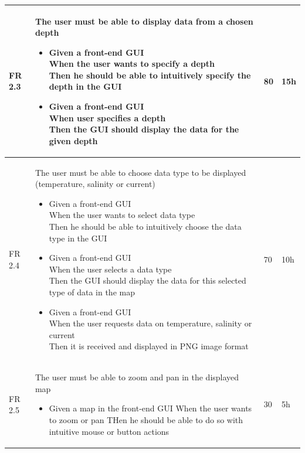 \documentclass[11pt,a4paper,titlepage,oneside]{report}
\begin{document}
\begin{longtable}{p{1.4cm} p{7.8cm} p{1cm} p{1cm} }
  FR 2.3 & The user must be able to display data from a chosen depth
  \begin{itemize}
  \item \parbox[t]{6.8cm}{
        Given a \gls{front-end} \gls{GUI} \\
        When the user wants to specify a depth \\
        Then he should be able to intuitively specify the depth in the \gls{GUI}}
  \item \parbox[t]{6.8cm}{
        Given a \gls{front-end} \gls{GUI} \\
        When user specifies a depth \\
        Then the \gls{GUI} should display the data for the given depth}
  \end{itemize}
  & 80 & 15h \\ \hline

  FR 2.4 & The user must be able to choose data type to be displayed (temperature, salinity or current)
  \begin{itemize}
  \item \parbox[t]{6.8cm}{
        Given a \gls{front-end} \gls{GUI} \\
        When the user wants to select data type \\
        Then he should be able to intuitively choose the data type in the \gls{GUI}}
  \item \parbox[t]{6.8cm}{
        Given a \gls{front-end} \gls{GUI} \\
        When the user selects a data type \\
        Then the \gls{GUI} should display the data for this selected type of data in the map}
  \item \parbox[t]{6.8cm}{
        Given a \gls{front-end} \gls{GUI} \\
        When the user requests data on temperature, salinity or current \\
        Then it is received and displayed in \gls{PNG} image format}
  \end{itemize}
  & 70 & 10h \\ \hline

  FR 2.5 & The user must be able to zoom and pan in the displayed map
  \begin{itemize}
  \item \parbox[t]{6.8cm}{
        Given a map in the \gls{front-end} \gls{GUI}
        When the user wants to zoom or pan
        THen he should be able to do so with intuitive mouse or button actions}
  \end{itemize}
  & 30 & 5h \\ \hline


\end{longtable}
\end{document}
